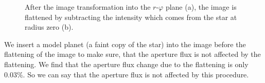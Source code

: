 \begin{figure}[H]
	\centering
\caption{After the image transformation into the $r$-$\varphi$ plane (a), the image is flattened by subtracting the intensity which comes from the star at radius zero (b).}
\label{fig:flatten_R150-300}
\end{figure}
We insert a model planet (a faint copy of the star) into the image before the flattening of the image to make sure, that the aperture flux is not affected by the flattening. We find that the aperture flux change due to the flattening is only $0.03 \%$. So we can say that the aperture flux is not affected by this procedure. 